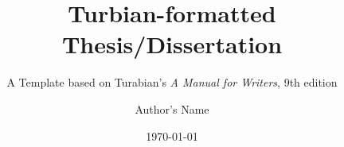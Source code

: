 \documentclass{turabian-thesis}
\title{Turbian-formatted Thesis/Dissertation}
\subtitle{A Template based on Turabian's \emph{A Manual for Writers}, 9th edition}
\author{Author's Name}
\date{\today}
\begin{document}
\frontmatter
\maketitle



\tableofcontents
\listofillustrations

\mainmatter





\backmatter
\begin{appendixes}
    
    
\end{appendixes}

\printbibliography
\end{document}
